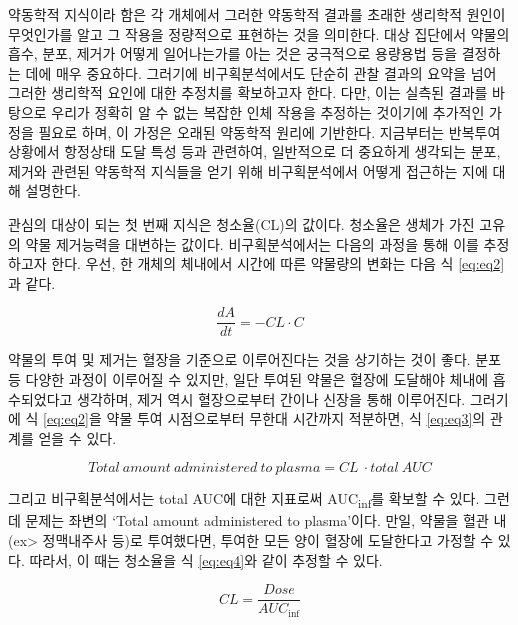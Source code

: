 \documentclass[
  11pt,
  krantz2, a4paper, twoside]{krantz}
\theoremstyle{definition}
\theoremstyle{definition}
\theoremstyle{definition}
\theoremstyle{definition}
\theoremstyle{remark}
\begin{document}
약동학적 지식이라 함은 각 개체에서 그러한 약동학적 결과를 초래한 생리학적 원인이 무엇인가를 알고 그 작용을 정량적으로 표현하는 것을 의미한다. 대상 집단에서 약물의 흡수, 분포, 제거가 어떻게 일어나는가를 아는 것은 궁극적으로 용량용법 등을 결정하는 데에 매우 중요하다. 그러기에 비구획분석에서도 단순히 관찰 결과의 요약을 넘어 그러한 생리학적 요인에 대한 추정치를 확보하고자 한다. 다만, 이는 실측된 결과를 바탕으로 우리가 정확히 알 수 없는 복잡한 인체 작용을 추정하는 것이기에 추가적인 가정을 필요로 하며, 이 가정은 오래된 약동학적 원리에 기반한다. 지금부터는 반복투여 상황에서 항정상태 도달 특성 등과 관련하여, 일반적으로 더 중요하게 생각되는 분포, 제거와 관련된 약동학적 지식들을 얻기 위해 비구획분석에서 어떻게 접근하는 지에 대해 설명한다.

관심의 대상이 되는 첫 번째 지식은 청소율(CL)의 값이다.
청소율은 생체가 가진 고유의 약물 제거능력을 대변하는 값이다.
비구획분석에서는 다음의 과정을 통해 이를 추정하고자 한다.
우선, 한 개체의 체내에서 시간에 따른 약물량의 변화는 다음 식 \eqref{eq:eq2}과 같다.

\begin{equation}
\frac{dA}{dt} = -CL \cdot C
\label{eq:eq2}
\end{equation}

약물의 투여 및 제거는 혈장을 기준으로 이루어진다는 것을 상기하는 것이 좋다.
분포 등 다양한 과정이 이루어질 수 있지만, 일단 투여된 약물은 혈장에 도달해야 체내에 흡수되었다고 생각하며, 제거 역시 혈장으로부터 간이나 신장을 통해 이루어진다.
그러기에 식 \eqref{eq:eq2}을 약물 투여 시점으로부터 무한대 시간까지 적분하면, 식 \eqref{eq:eq3}의 관계를 얻을 수 있다.

\begin{equation}
Total\ amount\ administered\ to\ plasma = CL\  \cdot total\ AUC
\label{eq:eq3}
\end{equation}

그리고 비구획분석에서는 total AUC에 대한 지표로써 AUC\textsubscript{inf}를 확보할 수 있다.
그런데 문제는 좌변의 `Total amount administered to plasma'이다.
만일, 약물을 혈관 내(ex\textgreater{} 정맥내주사 등)로 투여했다면, 투여한 모든 양이 혈장에 도달한다고 가정할 수 있다.
따라서, 이 때는 청소율을 식 \eqref{eq:eq4}와 같이 추정할 수 있다.

\begin{equation}
CL = \frac{{Dose}}{{AUC}_{\inf}}
\label{eq:eq4}
\end{equation}
\end{document}
